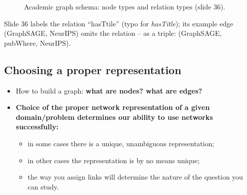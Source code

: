 \begin{figure}[htbp]
  \centering
  \caption{Academic graph schema: node types and relation types (slide 36).}\label{fig:lec01-academic}
\end{figure}

\begin{caution}
  Slide 36 labels the relation ``hasTtile'' (typo for \emph{hasTitle}); its example edge
  (GraphSAGE, NeurIPS) omits the relation -- as a triple: (GraphSAGE, pubWhere, NeurIPS).
\end{caution}

\subsection{Choosing a proper representation}\label{sec:lec01-choosing}

\begin{itemize}
  \item How to build a graph: \textbf{what are nodes? what are edges?}
  \item \textbf{Choice of the proper network representation of a given domain/problem
    determines our ability to use networks successfully:}
    \begin{itemize}
      \item in some cases there is a unique, unambiguous representation;
      \item in other cases the representation is by no means unique;
      \item the way you assign links will determine the nature of the question you can
        study.
    \end{itemize}
\end{itemize}

